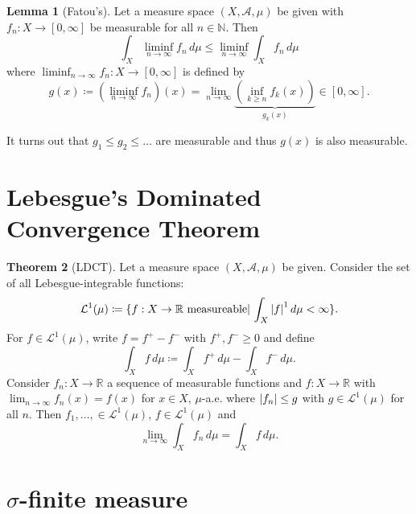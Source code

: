 \documentclass{article}
\theoremstyle{definition}
\newcommand{\lag}{\mathcal{L}}
\newcommand{\lp}{\left(}
\newcommand{\rp}{\right)}
\theoremstyle{theorem}
\newtheorem{theorem}{Theorem}[section]
\newtheorem{lemma}[theorem]{Lemma}
\begin{document}
\begin{lemma}[Fatou's] 
Let a measure space $(X,\mathcal{A},\mu)$ be given with $f_n : X \to [0,\infty]$ be measurable for all $n\in \mathbb{N}$. Then 
\begin{equation*}
    \int_X \liminf_{n\to \infty} f_n \,d\mu \leq \liminf_{n\to \infty} \int_X f_n \,d\mu
\end{equation*}
where $\liminf_{n\to \infty} f_n: X \to [0,\infty]$ is defined by
\begin{equation*}
    g(x) \coloneqq \lp\liminf_{n\to \infty} f_n \rp (x) = \lim_{n\to \infty} \underbrace{\lp\inf_{k \geq n} f_k(x)\rp}_{g_k(x) }  \in [0,\infty].
\end{equation*}
\end{lemma}
It turns out that $g_1 \leq g_2 \leq \dots$ are measurable and thus $g(x)$ is also measurable.  


\section{Lebesgue's Dominated Convergence Theorem}


\begin{theorem}[LDCT]
Let a measure space $(X,\mathcal{A},\mu)$ be given. Consider the set of all Lebesgue-integrable functions:
\begin{equation*}
    \lag^1(\mu) \coloneqq \{ f: X \to \mathbb{R} \text{ measureable}\vert \, \int_X \abs{f}^1\,d\mu < \infty \}.
\end{equation*}
For $f\in \lag^{1}(\mu)$, write $f = f^+ - f^-$ with $f^+,f^- \geq 0$ and define
\begin{equation*}
    \int_X f\,d\mu \coloneqq \int_X f^+ \,d\mu - \int_X f^- \,d\mu.
\end{equation*}
Consider $f_n : X \to \mathbb{R}$ a sequence of measurable functions and $f : X \to \mathbb{R}$ with $\lim_{n\to \infty} f_n(x) = f(x)$ for $x\in X$, $\mu$-a.e. where $\abs{f_n} \leq g$ with $g\in \lag^1(\mu)$ for all $n$. Then $f_1, \dots, \in \lag^{1}(\mu)$, $f\in \lag^{1}(\mu)$ and 
\begin{equation*}
    \lim_{n\to \infty} \int_X f_n\,d\mu = \int_X f\,d\mu.
\end{equation*}
\end{theorem}


\section{$\sigma$-finite measure}
\end{document}

